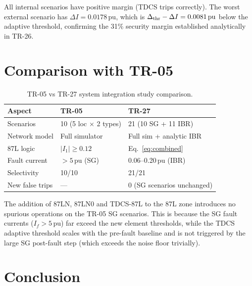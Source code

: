 \documentclass[11pt,a4paper]{article}
\begin{document}
All internal scenarios have positive margin (TDCS trips correctly).  The
worst external scenario has $\Delta I = 0.0178\,\text{pu}$, which is
$\Delta_{\rm thr} - \Delta I = 0.0081\,\text{pu}$ below the adaptive
threshold, confirming the 31\% security margin established analytically
in TR-26.

\section{Comparison with TR-05}

\begin{table}[h!]
\centering
\caption{TR-05 vs TR-27 system integration study comparison.}
\label{tab:compare}
\begin{tabular}{lll}
\toprule
Aspect & TR-05 & TR-27 \\
\midrule
Scenarios        & 10 (5 loc × 2 types)     & 21 (10 SG + 11 IBR) \\
Network model    & Full simulator            & Full sim + analytic IBR \\
87L logic        & $|I_1| \geq 0.12$         & Eq.~\eqref{eq:combined} \\
Fault current    & $>5$\,pu (SG)             & 0.06–0.20\,pu (IBR) \\
Selectivity      & 10/10                     & 21/21 \\
New false trips  & —                         & 0 (SG scenarios unchanged) \\
\bottomrule
\end{tabular}
\end{table}

The addition of 87LN, 87LN0 and TDCS-87L to the 87L zone introduces
no spurious operations on the TR-05 SG scenarios.  This is because
the SG fault currents ($I_f > 5$\,pu) far exceed the new element
thresholds, while the TDCS adaptive threshold scales with the
pre-fault baseline and is not triggered by the large SG post-fault step
(which exceeds the noise floor trivially).

\section{Conclusion}
\end{document}
